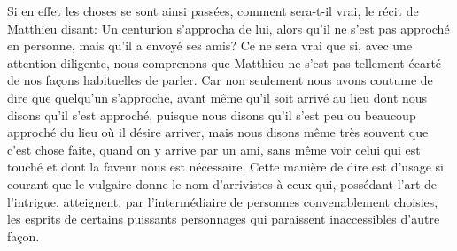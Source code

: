 Si en effet les choses se sont ainsi passées,
	comment sera-t-il vrai, le récit de Matthieu disant:
		Un centurion s’approcha de lui,
	alors qu’il ne s’est pas approché en personne, mais qu’il a envoyé ses amis?
Ce ne sera vrai que si, avec une attention diligente,
	nous comprenons que Matthieu
		ne s’est pas tellement écarté de nos façons habituelles de parler.
Car non seulement nous avons coutume de dire que quelqu’un s’approche,
	avant même qu’il soit arrivé au lieu dont nous disons qu’il s’est approché,
	puisque nous disons
		qu’il s’est peu ou beaucoup approché du lieu où il désire arriver,
	mais nous disons même très souvent que c’est chose faite,
		quand on y arrive par un ami,
	sans même voir celui qui est touché et dont la faveur nous est nécessaire.
Cette manière de dire est d’usage si courant
	que le vulgaire donne le nom d’arrivistes à ceux qui,
	possédant l’art de l’intrigue,
		atteignent, par l’intermédiaire de personnes convenablement choisies,
	les esprits de certains puissants personnages
		qui paraissent inaccessibles d’autre façon.
